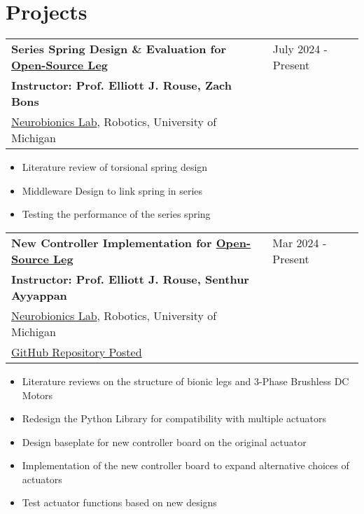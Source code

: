 \documentclass[letter,12pt]{article}
\begin{document}
\section{Projects}

\begin{tabularx}{\linewidth}{@{}l X@{}}
    \large \textbf{Series Spring Design \& Evaluation for \href{https://www.opensourceleg.org/about}{Open-Source Leg}} & \hfill July 2024 - Present \\
    \small{\textbf{Instructor: Prof. Elliott J. Rouse, Zach Bons}} & \hfill {} \\
    \small{\href{https://neurobionics.robotics.umich.edu/}{Neurobionics Lab}, Robotics, University of Michigan} & \hfill {} \\
    \end{tabularx}
    
    \begin{itemize}[
        rightmargin=2cm
    ]
        \setlength{\itemsep}{1pt}
        \setlength{\parskip}{0pt}
        \setlength{\parsep}{0pt}
        \item{\small Literature review of torsional spring design}
        \item{\small Middleware Design to link spring in series}
        \item{\small Testing the performance of the series spring}
    \end{itemize}

\begin{tabularx}{\linewidth}{@{}l X@{}}
\large \textbf{New Controller Implementation for \href{https://www.opensourceleg.org/about}{Open-Source Leg}} & \hfill Mar 2024 - Present \\
\small{\textbf{Instructor: Prof. Elliott J. Rouse, Senthur Ayyappan}} & \hfill {} \\
\small{\href{https://neurobionics.robotics.umich.edu/}{Neurobionics Lab}, Robotics, University of Michigan} & \hfill {} \\
\small{\href{https://github.com/neurobionics/opensourceleg}{GitHub Repository Posted}} & \hfill {} \\
\end{tabularx}

\begin{itemize}[
    rightmargin=2cm
]
    \setlength{\itemsep}{1pt}
    \setlength{\parskip}{0pt}
    \setlength{\parsep}{0pt}
    \item{\small Literature reviews on the structure of bionic legs and 3-Phase Brushless DC Motors}
    \item{\small Redesign the Python Library for compatibility with multiple actuators}
    \item{\small Design baseplate for new controller board on the original actuator}
    \item{\small Implementation of the new controller board to expand alternative choices of actuators}
    \item{\small Test actuator functions based on new designs}
\end{itemize}
\end{document}
